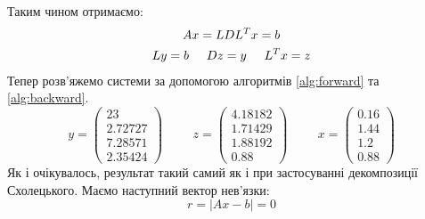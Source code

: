 Таким чином отримаємо:
\begin{gather*}
    Ax = LDL^Tx= b \\
    Ly = b \hspace{0.5cm}
    Dz = y \hspace{0.5cm}
    L^T x = z
\end{gather*}
Тепер розв'яжемо системи за допомогою
алгоритмів \ref{alg:forward} та
\ref{alg:backward}.
\[
    y = \begin{pmatrix}
        23 \\
        2.72727 \\
        7.28571 \\
        2.35424
    \end{pmatrix} \hspace{1cm}
    z = \begin{pmatrix}
        4.18182 \\
        1.71429 \\
        1.88192 \\
        0.88
    \end{pmatrix} \hspace{1cm}
    x = \begin{pmatrix}
        0.16 \\
        1.44 \\
        1.2 \\
        0.88
    \end{pmatrix}
\]
Як і очікувалось, результат такий самий як і при застосуванні декомпозиції Схолецького.
Маємо наступний вектор нев'язки:
\[
    r=|Ax-b| = 0
\]
